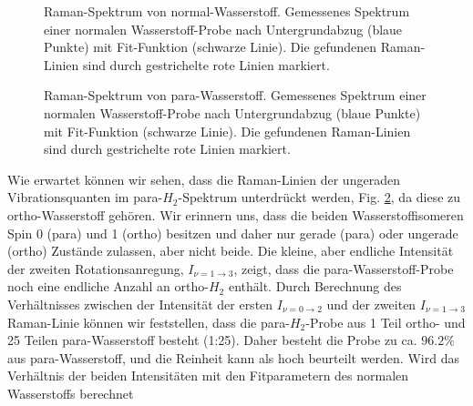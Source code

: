 \documentclass[11pt]{article}
\begin{document}
\begin{figure}[htbp]
	\centering
   \caption{\small Raman-Spektrum von normal-Wasserstoff. Gemessenes Spektrum einer normalen Wasserstoff-Probe nach Untergrundabzug (blaue Punkte) mit Fit-Funktion (schwarze Linie). Die gefundenen Raman-Linien sind durch gestrichelte rote Linien markiert.}
   \label{fig:normal_H2}
\end{figure}

\begin{figure}[htbp]
	\centering
   \caption{\small Raman-Spektrum von para-Wasserstoff. Gemessenes Spektrum einer normalen Wasserstoff-Probe nach Untergrundabzug (blaue Punkte) mit Fit-Funktion (schwarze Linie). Die gefundenen Raman-Linien sind durch gestrichelte rote Linien markiert.}
   \label{fig:para_H2}
\end{figure}

Wie erwartet können wir sehen, dass die Raman-Linien der ungeraden Vibrationsquanten im para-$H_2$-Spektrum unterdrückt werden, Fig. \ref{fig:para_H2}, da diese zu ortho-Wasserstoff gehören. Wir erinnern uns, dass die beiden Wasserstoffisomeren Spin 0 (para) und 1 (ortho) besitzen und daher nur gerade (para) oder ungerade (ortho) Zustände zulassen, aber nicht beide. Die kleine, aber endliche Intensität der zweiten Rotationsanregung, $I_{\nu  = 1 \to 3}$, zeigt, dass die para-Wasserstoff-Probe noch eine endliche Anzahl an ortho-$H_2$ enthält. Durch Berechnung des Verhältnisses zwischen der Intensität der ersten $I_{\nu  = 0 \to 2}$ und der zweiten $I_{\nu  = 1 \to 3}$ Raman-Linie können wir feststellen, dass die para-$H_2$-Probe aus 1 Teil ortho- und 25 Teilen para-Wasserstoff besteht (1:25). Daher besteht die Probe zu ca. $96.2\%$ aus para-Wasserstoff, und die Reinheit kann als hoch beurteilt werden. Wird das Verhältnis der beiden Intensitäten mit den Fitparametern des normalen Wasserstoffs berechnet
\end{document}
